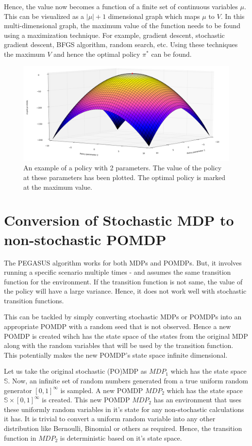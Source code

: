\documentclass[hidelinks,BTech]{iitmdiss}
\begin{document}
Hence, the value now becomes a function of a finite set of continuous variables $\mu$. This can be visualized as a $|\mu|+1$ dimensional graph which maps $\mu$ to $V$. In this multi-dimensional graph, the maximum value of the function needs to be found using a maximization technique. For example, gradient descent, stochastic gradient descent, BFGS algorithm, random search, etc. Using these techniques the maximum $V$ and hence the optimal policy $\pi^{*}$ can be found.

\begin{figure}[H]
  \centering
    \includegraphics[width=\textwidth]{gradient_descent.png}
    \caption{An example of a policy with 2 parameters. The value of the policy at these parameters has been plotted. The optimal policy is marked at the maximum value.}
\end{figure}

\section{Conversion of Stochastic MDP to non-stochastic POMDP}

The PEGASUS algorithm works for both MDPs and POMDPs. But, it involves running a specific scenario multiple times - and assumes the same transition function for the environment. If the transition function is not same, the value of the policy will have a large variance. Hence, it does not work well with stochastic transition functions.

This can be tackled by simply converting stochastic MDPs or POMDPs into an appropriate POMDP with a random seed that is not observed. Hence a new POMDP is created wihch has the state space of the states from the original MDP along with the random variables that will be used by the transition function. This potentially makes the new POMDP's state space infinite dimensional.

Let us take the original stochastic (PO)MDP as $MDP_{1}$ which has the state space $\mathbb{S}$. Now, an infinite set of random numbers generated from a true uniform random generator $[0,1]^{\infty}$ is sampled. A new POMDP $MDP_{2}$ which has the state space $\mathbb{S} \times [0,1]^{\infty}$ is created. This new POMDP $MDP_{2}$ has an environment that uses these uniformly random variables in it's state for any non-stochastic calculations it has. It is trivial to convert a uniform random variable into any other distribution like Bernoulli, Binomial or others as required. Hence, the transition function in $MDP_{2}$ is deterministic based on it's state space.
\end{document}
